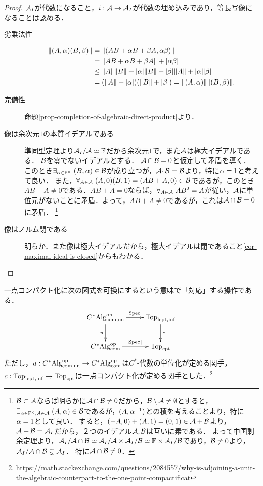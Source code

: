 \documentclass[uplatex,dvipdfmx]{jsreport}
\begin{document}
\begin{proof}
    $\mathcal{A}_I$が代数になること，$i:\mathcal{A}\to\mathcal{A}_I$が代数の埋め込みであり，等長写像になることは認める．
    \begin{description}
        \item[劣乗法性] \begin{align*}
            \|(A,\alpha)(B,\beta)\|&=\|(AB+\alpha B+\beta A,\alpha\beta)\|\\
            &=\|AB+\alpha B+\beta A\|+\lvert\alpha\beta\rvert\\
            &\le\|A\|\|B\|+\lvert\alpha\rvert\|B\|+\lvert\beta\rvert\|A\|+\lvert\alpha\rvert\lvert\beta\rvert\\
            &=(\|A\|+\lvert\alpha\rvert)(\|B\|+\lvert\beta\rvert)=\|(A,\alpha)\|\|(B,\beta)\|.
        \end{align*}
        \item[完備性] 命題\ref{prop-completion-of-algebraic-direct-product}より．
        \item[像は余次元$1$の本質イデアルである] 準同型定理より$\mathcal{A}_I/\mathcal{A}\simeq\mathbb{F}$だから余次元$1$で，また$\mathcal{A}$は極大イデアルである．
        $\mathcal{B}$を零でないイデアルとする．
        $\mathcal{A}\cap\mathcal{B}=0$と仮定して矛盾を導く．
        このとき$\exists_{\alpha\in\mathbb{F}^\times}\;(B,\alpha)\in\mathcal{B}$が成り立つが，$\mathcal{A}_1\mathcal{B}=\mathcal{B}$より，特に$\alpha=1$と考えて良い．
        また，$\forall_{A\in\mathcal{A}}\;(A,0)(B,1)=(AB+A,0)\in\mathcal{B}$であるが，このとき$AB+A\ne0$である．$AB+A=0$ならば，$\forall_{A\in\mathcal{A}}\;AB^2=A$が従い，$\mathcal{A}$に単位元がないことに矛盾．よって，$AB+A\ne0$であるが，これは$\mathcal{A}\cap\mathcal{B}=0$に矛盾．
        \footnote{$\mathcal{B}\subset\mathcal{A}$ならば明らかに$\mathcal{A}\cap\mathcal{B}\ne0$だから，$\mathcal{B}\setminus\mathcal{A}\ne\emptyset$とすると，$\exists_{\alpha\in\mathbb{F}^\times,A\in\mathcal{A}}\;(A,\alpha)\in\mathcal{B}$であるが，$(A,\alpha^{-1})$との積を考えることより，特に$\alpha=1$として良い．
        すると，$(-A,0)+(A,1)=(0,1)\in \mathcal{A}+\mathcal{B}$より，$\mathcal{A}+\mathcal{B}=\mathcal{A}_I$だから，２つのイデアル$\mathcal{A},\mathcal{B}$は互いに素である．
        よって中国剰余定理より，$\mathcal{A}_I/\mathcal{A}\cap\mathcal{B}\simeq\mathcal{A}_I/\mathcal{A}\times\mathcal{A}_I/\mathcal{B}\simeq\mathbb{F}\times\mathcal{A}_I/\mathcal{B}$であり，$\mathcal{B}\ne0$より，$\mathcal{A}_I/\mathcal{A}\cap\mathcal{B}\subsetneq\mathcal{A}_I$．
        特に$\mathcal{A}\cap\mathcal{B}\ne0$．}
        \item[像はノルム閉である]
        明らか．また像は極大イデアルだから，極大イデアルは閉であること\ref{cor-maximal-ideal-is-closed}からもわかる．
    \end{description}
\end{proof}
\begin{remarks}[一点コンパクト化との対応]
    一点コンパクト化に次の図式を可換にするという意味で「対応」する操作である．
    \[\xymatrix{
        C^*\Alg_{\com,\nonunital}^\op\ar[r]^-{\Spec}\ar[d]_-{u}&\Top_{\lcpt,\infinity}\ar[d]^-c\\
        C^*\Alg^\op_\com\ar[r]^-{\Spec|}&\Top_\cpt
    }\]
    ただし，$u:C^*\mathrm{Alg}^{\mathrm{op}}_{\mathrm{com},\mathrm{nu}}\to C^*\mathrm{Alg}^{\mathrm{op}}_{\mathrm{com}}$は$C^*$-代数の単位化が定める関手，$c:\mathrm{Top}_{\mathrm{lcpt},\mathrm{inf}}\to\mathrm{Top}_{\mathrm{cpt}}$は一点コンパクト化が定める関手とした．\footnote{\url{https://math.stackexchange.com/questions/2084557/why-is-adjoining-a-unit-the-algebraic-counterpart-to-the-one-point-compactificat}}
\end{remarks}
\end{document}
